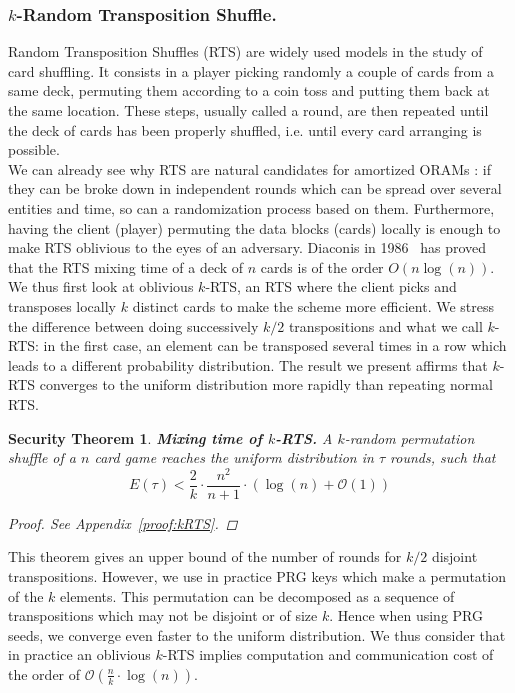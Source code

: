 \documentclass[USenglish,oneside,twocolumn]{article}
\newtheorem{secthm}{Security Theorem}
\begin{document}
\subsubsection{$k$-Random Transposition Shuffle.}\label{kRTS}
Random Transposition Shuffles (RTS) are widely used models in the study of card shuffling. It consists in a player picking randomly a couple of cards from a same deck, permuting them according to a coin toss and putting them back at the same location.
These steps, usually called a round, are then repeated until the deck of cards has been properly shuffled, i.e. until every card arranging is possible.\\
We can already see why RTS are natural candidates for amortized ORAMs : if they can be broke down in independent rounds which can be spread over several entities and time, so can a randomization process based on them. Furthermore, having the client (player) permuting the data blocks (cards) locally is enough to make RTS oblivious to the eyes of an adversary.
Diaconis in 1986~\cite{aldous1986shuffling} has proved that the RTS mixing time of a deck of $n$ cards is of the order  $O\left(n\log(n)\right)$. We thus first look at oblivious $k$-RTS, an RTS where the client picks and transposes locally $k$ distinct cards to make the scheme more efficient. We stress the difference between doing successively $k/2$ transpositions and what we call $k$-RTS: in the first case, an element can be transposed several times in a row which leads to a different probability distribution. The result we present affirms that  $k$-RTS converges to the uniform distribution more rapidly than repeating normal RTS.  

\begin{secthm}
\textbf{Mixing time of $k$-RTS.} A $k$-random permutation shuffle of a $n$ card game reaches the uniform distribution in $\tau$ rounds, such that
$$E(\tau) < \frac{2}{k}\cdot\frac{n^2}{n+1}\cdot \left ( \log(n) + \mathcal{O}(1) \right ) $$
\begin{proof}
See Appendix~\ref{proof:kRTS}.
\end{proof}
\end{secthm}

This theorem gives an upper bound of the number of rounds for $k/2$ disjoint transpositions. However, we use in practice PRG keys which make a permutation of the $k$ elements. This permutation can be decomposed as a sequence of transpositions which may not be disjoint or of size $k$. Hence when using PRG seeds, we converge even faster to the uniform distribution. We thus consider that in practice an oblivious $k$-RTS implies computation and communication cost of the order of $\mathcal{O} \left(\frac{n}{k}\cdot \log(n)\right)$.
\end{document}
